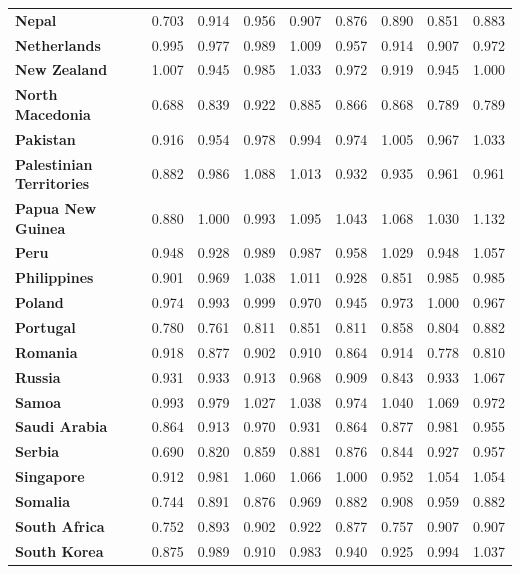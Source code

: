 \begin{table}
{\begin{tabular}{lllllllll}
    \textbf{Nepal} & 0.703 & 0.914 & 0.956 & 0.907 & 0.876 & 0.890 & 0.851 & 0.883 \\
    \textbf{Netherlands} & 0.995 & 0.977 & 0.989 & 1.009 & 0.957 & 0.914 & 0.907 & 0.972 \\
    \textbf{New Zealand} & 1.007 & 0.945 & 0.985 & 1.033 & 0.972 & 0.919 & 0.945 & 1.000 \\
    \textbf{North Macedonia} & 0.688 & 0.839 & 0.922 & 0.885 & 0.866 & 0.868 & 0.789 & 0.789 \\
    \textbf{Pakistan} & 0.916 & 0.954 & 0.978 & 0.994 & 0.974 & 1.005 & 0.967 & 1.033 \\
    \textbf{Palestinian Territories} & 0.882 & 0.986 & 1.088 & 1.013 & 0.932 & 0.935 & 0.961 & 0.961 \\
    \textbf{Papua New Guinea} & 0.880 & 1.000 & 0.993 & 1.095 & 1.043 & 1.068 & 1.030 & 1.132 \\
    \textbf{Peru} & 0.948 & 0.928 & 0.989 & 0.987 & 0.958 & 1.029 & 0.948 & 1.057 \\
    \textbf{Philippines} & 0.901 & 0.969 & 1.038 & 1.011 & 0.928 & 0.851 & 0.985 & 0.985 \\
    \textbf{Poland} & 0.974 & 0.993 & 0.999 & 0.970 & 0.945 & 0.973 & 1.000 & 0.967 \\
    \textbf{Portugal} & 0.780 & 0.761 & 0.811 & 0.851 & 0.811 & 0.858 & 0.804 & 0.882 \\
    \textbf{Romania} & 0.918 & 0.877 & 0.902 & 0.910 & 0.864 & 0.914 & 0.778 & 0.810 \\
    \textbf{Russia} & 0.931 & 0.933 & 0.913 & 0.968 & 0.909 & 0.843 & 0.933 & 1.067 \\
    \textbf{Samoa} & 0.993 & 0.979 & 1.027 & 1.038 & 0.974 & 1.040 & 1.069 & 0.972 \\
    \textbf{Saudi Arabia} & 0.864 & 0.913 & 0.970 & 0.931 & 0.864 & 0.877 & 0.981 & 0.955 \\
    \textbf{Serbia} & 0.690 & 0.820 & 0.859 & 0.881 & 0.876 & 0.844 & 0.927 & 0.957 \\
    \textbf{Singapore} & 0.912 & 0.981 & 1.060 & 1.066 & 1.000 & 0.952 & 1.054 & 1.054 \\
    \textbf{Somalia} & 0.744 & 0.891 & 0.876 & 0.969 & 0.882 & 0.908 & 0.959 & 0.882 \\
    \textbf{South Africa} & 0.752 & 0.893 & 0.902 & 0.922 & 0.877 & 0.757 & 0.907 & 0.907 \\
    \textbf{South Korea} & 0.875 & 0.989 & 0.910 & 0.983 & 0.940 & 0.925 & 0.994 & 1.037 \\

\end{tabular}}
\end{table}

